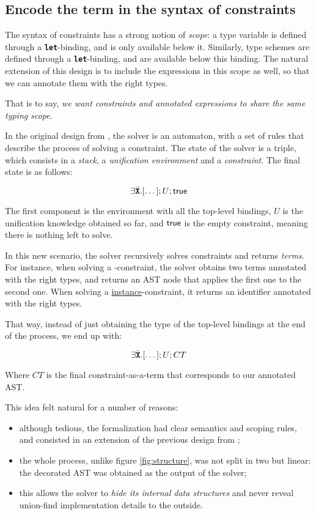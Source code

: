 \documentclass[10pt,a4paper,twoside,titlepage,twocolumn]{article}
\newcommand{\code}[1]{\textbf{\texttt{#1}}}
\begin{document}
\subsection{Encode the term in the syntax of constraints}

The syntax of constraints has a strong notion of \emph{scope}: a type variable is
defined through a \code{let}-binding, and is only available below it. Similarly,
type schemes are defined through a \code{let}-binding, and are available below
this binding. The natural extension of this design is to include the expressions
in this scope as well, so that we can annotate them with the right types.

That is to say, \emph{we want constraints and annotated expressions to share the
same typing scope}.

In the original design from \cite{pottier2005essence}, the solver is an
automaton, with a set of rules that describe the process of solving a
constraint. The state of the solver is a triple, which consists in a
\emph{stack}, a \emph{unification environment} and a \emph{constraint}. The
final state is as follows:

$$\cexists\tvars[\dots]; U; \ctrue$$

The first component is the environment with all the top-level bindings, $U$ is
the unification knowledge obtained so far, and $\text{\textsf{true}}$ is the empty constraint,
meaning there is nothing left to solve.

In this new scenario, the solver recursively solves constraints and returns
\emph{terms}. For instance, when solving a \underline{}-constraint,
the solver obtains two terms annotated with the right types, and returns an AST
node that applies the first one to the second one. When solving a
\underline{instance}-constraint, it returns an identifier annotated with the
right types. 

That way, instead of just obtaining the type of the top-level
bindings at the end of the process, we end up with:

$$\cexists\tvars[\dots]; U; CT$$

Where $CT$ is the final constraint-as-a-term that corresponds to our annotated AST.

This idea felt natural for a number of reasons:
\begin{itemize}
  \item although tedious, the formalization had clear semantics and scoping
    rules, and consisted in an extension of the previous design from
    \cite{pottier2005essence};
  \item the whole process, unlike figure \vref{fig:structure}, was not split in
    two but linear: the decorated AST was obtained as the output of the solver;
  \item this allows the solver to \emph{hide its internal data structures} and
    never reveal union-find implementation details to the outside.
\end{itemize}
\end{document}
